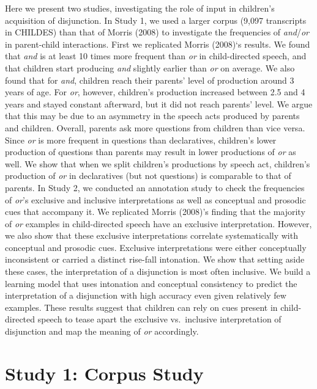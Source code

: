 \documentclass[10pt, letterpaper]{article}
\begin{document}
Here we present two studies, investigating the role of input in
children's acquisition of disjunction. In Study 1, we used a larger
corpus (9,097 transcripts in CHILDES) than that of Morris (2008) to
investigate the frequencies of \emph{and}/\emph{or} in parent-child
interactions. First we replicated Morris (2008)`s results. We found that
\emph{and} is at least 10 times more frequent than \emph{or} in
child-directed speech, and that children start producing \emph{and}
slightly earlier than \emph{or} on average. We also found that for
\emph{and}, children reach their parents' level of production around 3
years of age. For \emph{or}, however, children's production increased
between 2.5 and 4 years and stayed constant afterward, but it did not
reach parents' level. We argue that this may be due to an asymmetry in
the speech acts produced by parents and children. Overall, parents ask
more questions from children than vice versa. Since \emph{or} is more
frequent in questions than declaratives, children's lower production of
questions than parents may result in lower productions of \emph{or} as
well. We show that when we split children's productions by speech act,
children's production of \emph{or} in declaratives (but not questions)
is comparable to that of parents. In Study 2, we conducted an annotation
study to check the frequencies of \emph{or}'s exclusive and inclusive
interpretations as well as conceptual and prosodic cues that accompany
it. We replicated Morris (2008)'s finding that the majority of \emph{or}
examples in child-directed speech have an exclusive interpretation.
However, we also show that these exclusive interpretations correlate
systematically with conceptual and prosodic cues. Exclusive
interpretations were either conceptually inconsistent or carried a
distinct rise-fall intonation. We show that setting aside these cases,
the interpretation of a disjunction is most often inclusive. We build a
learning model that uses intonation and conceptual consistency to
predict the interpretation of a disjunction with high accuracy even
given relatively few examples. These results suggest that children can
rely on cues present in child-directed speech to tease apart the
exclusive vs.~inclusive interpretation of disjunction and map the
meaning of \emph{or} accordingly.

\section{Study 1: Corpus Study}\label{study-1-corpus-study}
\end{document}
